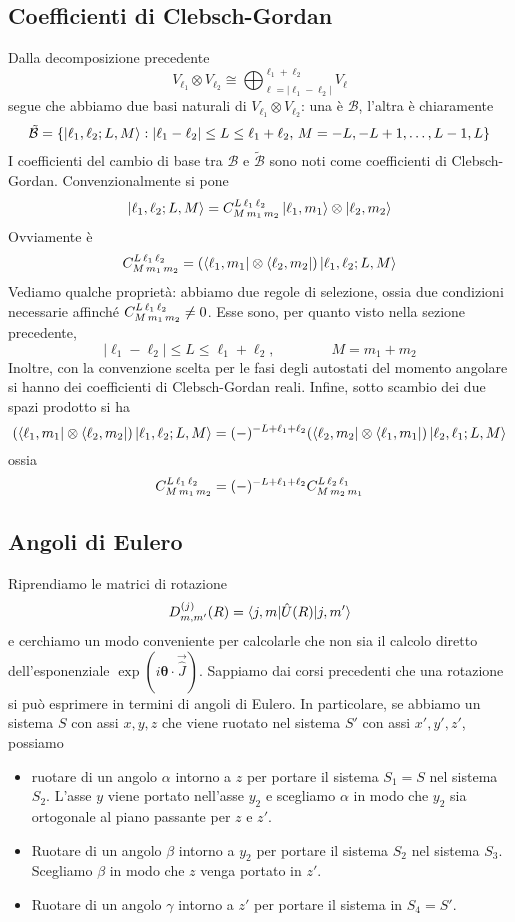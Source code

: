 \documentclass[a4paper, 11pt]{article}
\newcommand{\op}{\hat}
\newcommand{\Op}[1]{\vec{\hat{#1}}}
\newcommand{\1}{\mathbbm{1}}
\renewcommand{\l}{\ell}
\begin{document}
	\subsection{Coefficienti di Clebsch-Gordan}
	Dalla decomposizione precedente
	\[V_{\l_1}\otimes V_{\l_2}\cong\bigoplus_{\l=|\l_1-\l_2|}^{\l_1+\l_2}V_\l\]
	segue che abbiamo due basi naturali di $V_{\l_1}\otimes V_{\l_2}$: una è $\mathcal{B}$, l'altra è chiaramente
	\[\tilde{\mathcal{B}}=\left\{\ket{\l_1,\l_2;L,M}:|\l_1-\l_2|\leq L\leq \l_1+\l_2,\,M=-L,-L+1,\dots,L-1,L\right\}\]
	I coefficienti del cambio di base tra $\mathcal{B}$ e $\tilde{\mathcal{B}}$ sono noti come coefficienti di Clebsch-Gordan. Convenzionalmente si pone
	\[\ket{\l_1,\l_2;L,M}=\tensor*{C}{^{L\,\l_1\,\l_2}_{M\,m_1\,m_2}}\ket{\l_1,m_1}\otimes\ket{\l_2,m_2}\]
	Ovviamente è
	\[\tensor*{C}{^{L\,\l_1\,\l_2}_{M\,m_1\,m_2}}=(\bra {\l_1,m_1}\otimes\bra{\l_2,m_2})\ket{\l_1,\l_2;L,M}\]
	Vediamo qualche proprietà: abbiamo due regole di selezione, ossia due condizioni necessarie affinché $\tensor*{C}{^{L\,\l_1\,\l_2}_{M\,m_1\,m_2}}\neq0$. Esse sono, per quanto visto nella sezione precedente,
	\[|\l_1-\l_2|\leq L\leq \l_1+\l_2,\qquad\qquad M=m_1+m_2\]
	Inoltre, con la convenzione scelta per le fasi degli autostati del momento angolare si hanno dei coefficienti di Clebsch-Gordan reali. Infine, sotto scambio dei due spazi prodotto si ha
	\[(\bra{\l_1,m_1}\otimes\bra {\l_2,m_2})\ket{\l_1,\l_2;L,M}=(-)^{-L+\l_1+\l_2}(\bra{\l_2,m_2}\otimes\bra {\l_1,m_1})\ket{\l_2,\l_1;L,M}\]
	ossia
	\[\tensor*{C}{^{L\,\l_1\,\l_2}_{M\,m_1\,m_2}}=(-)^{-L+\l_1+\l_2}\tensor*{C}{^{L\,\l_2\,\l_1}_{M\,m_2\,m_1}}\]
	\subsection{Angoli di Eulero}
	Riprendiamo le matrici di rotazione
	\[D^{(j)}_{m,m'}(R)=\braketop{j,m}{\op U(R)}{j,m'}\]
	e cerchiamo un modo conveniente per calcolarle che non sia il calcolo diretto dell'esponenziale $\exp(i\bm\theta\cdot\Op J)$. Sappiamo dai corsi precedenti che una rotazione si può esprimere in termini di angoli di Eulero. In particolare, se abbiamo un sistema $S$ con assi $x,y,z$ che viene ruotato nel sistema $S'$ con assi $x',y',z'$, possiamo
	\begin{itemize}
		\item ruotare di un angolo $\alpha$ intorno a $z$ per portare il sistema $S_1=S$ nel sistema $S_2$. L'asse $y$ viene portato nell'asse $y_2$ e scegliamo $\alpha$ in modo che $y_2$ sia ortogonale al piano passante per $z$ e $z'$.
		\item Ruotare di un angolo $\beta$ intorno a $y_2$ per portare il sistema $S_2$ nel sistema $S_3$. Scegliamo $\beta$ in modo che $z$ venga portato in $z'$.
		\item Ruotare di un angolo $\gamma$ intorno a $z'$ per portare il sistema in $S_4=S'$. 
	\end{itemize}
\end{document}
